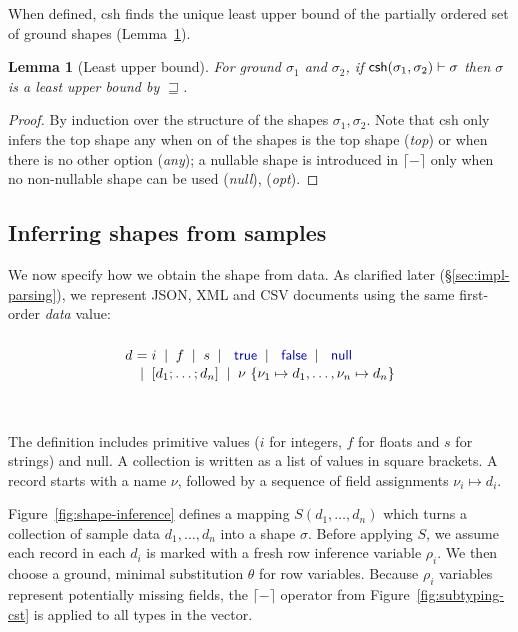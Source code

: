 \documentclass[10pt,nocopyrightspace]{sigplanconf}
\newcommand{\kvd}[1]{\textnormal{\textcolor{kvdclr}{\sffamily #1}}}
\newcommand{\ident}[1]{\textnormal{\sffamily #1}}
\newcommand{\lsep}[0]{\;\; | \;\;}
\newcommand{\narrow}[1]{\hspace{-0.7em} #1 \hspace{-0.7em}}
\newcommand{\addopt}[1]{\lceil#1\rceil}
\newcommand{\semalt}[1]{S(#1)}
\newtheorem{lemma}[theorem]{Lemma}
\begin{document}
When defined, \ident{csh} finds the unique least upper bound of the partially ordered
set of ground shapes (Lemma~\ref{thm:lub}).

\begin{lemma}[Least upper bound]
\label{thm:lub}
For ground $\sigma_1$ and $\sigma_2$, if $\ident{csh}(\sigma_1, \sigma_2) \vdash \sigma$ then $\sigma$ is a least upper bound by $\sqsupseteq$.
\end{lemma}
\begin{proof}
By induction over the structure of the shapes $\sigma_1,\sigma_2$. Note that \ident{csh} only infers the top shape
\kvd{any} when on of the shapes is the top shape (\emph{top}) or when there is no other option
(\emph{any}); a nullable shape is introduced in $\addopt{-}$ only when no non-nullable shape can
be used (\emph{null}), (\emph{opt}).
\end{proof}

\subsection{Inferring shapes from samples}
\label{sec:formal-inferval}

We now specify how we obtain the shape from data. As clarified later (\S\ref{sec:impl-parsing}),
we represent JSON, XML and CSV documents using the same first-order \emph{data} value:

\noindent
\begin{equation*}
\begin{array}{lcl}
  \\[-0.5em]
 d &\narrow{=}& i \lsep f \lsep s \lsep \kvd{true} \lsep \kvd{false} \lsep \kvd{null} \\[0.1em]
   &\narrow{|}& [d_1; \ldots; d_n] \lsep \nu~\{ \nu_1 \mapsto d_1, \ldots, \nu_n \mapsto d_n \}
\end{array}
\end{equation*}

~

\noindent
The definition includes primitive values ($i$ for integers, $f$ for floats
and $s$ for strings) and \kvd{null}. A collection is written as a
list of values in square brackets. A record starts with a name $\nu$, followed by a
sequence of field assignments $\nu_i \mapsto d_i$.

Figure~\ref{fig:shape-inference} defines a mapping $\semalt{d_1,\ldots,d_n}$ which turns a
collection of sample data $d_1, \ldots, d_n$ into a shape $\sigma$. Before applying $S$, we assume
each record in each $d_i$ is marked with a fresh row inference variable $\rho_i$.
We then choose a ground, minimal substitution $\theta$ for row variables. Because $\rho_i$ variables
represent potentially missing fields, the $\addopt{-}$ operator from Figure~\ref{fig:subtyping-cst}
is applied to all types in the vector.
\end{document}
